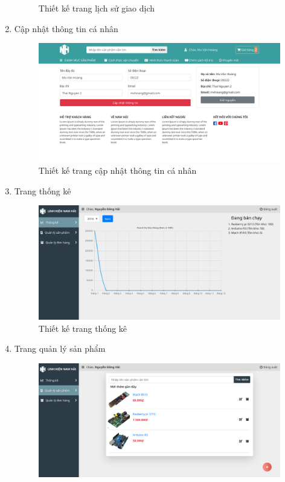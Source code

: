 \begin{enumerate}[label=\textbf{\alph*)}]
\begin{figure}[h!]
		      \caption{Thiết kế trang lịch sử giao dịch}
	      \end{figure}
	\item Cập nhật thông tin cá nhân
	      \begin{figure}[h!]
		      \includegraphics[width=\linewidth]{fig/r_user2.png}
		      \caption{Thiết kế trang cập nhật thông tin cá nhân}
	      \end{figure}
	      \newpage
	\item Trang thống kê
	      \begin{figure}[h!]
		      \includegraphics[width=\linewidth]{fig/r_manage_statistics.png}
		      \caption{Thiết kế trang thống kê}
	      \end{figure}
	\item Trang quản lý sản phẩm
	      \begin{figure}[h!]
		      \includegraphics[width=\linewidth]{fig/r_manage_product.png}

\end{figure}
\end{enumerate}
